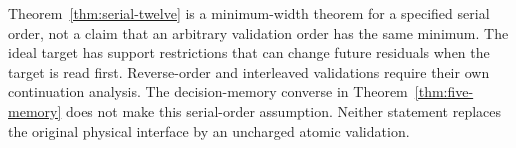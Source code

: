 Theorem~\ref{thm:serial-twelve} is a minimum-width theorem for a
specified serial order, not a claim that an arbitrary validation order
has the same minimum. The ideal target has support restrictions that
can change future residuals when the target is read first. Reverse-order
and interleaved validations require their own continuation analysis.
The decision-memory converse in Theorem~\ref{thm:five-memory} does not
make this serial-order assumption. Neither statement replaces the
original physical interface by an uncharged atomic validation.
